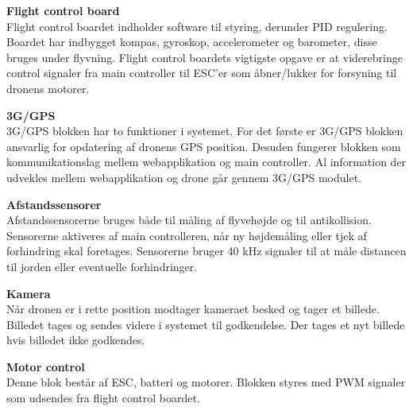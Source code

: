 \textbf{Flight control board}\\
Flight control boardet indholder software til styring, derunder PID regulering. Boardet har indbygget kompas, gyroskop, accelerometer og barometer, disse bruges under flyvning. Flight control boardets vigtigste opgave er at viderebringe control signaler fra main controller til ESC'er som åbner/lukker for forsyning til dronens motorer. 

\textbf{3G/GPS}\\
3G/GPS blokken har to funktioner i systemet. For det første er 3G/GPS blokken ansvarlig for opdatering af dronens GPS position. Desuden fungerer blokken som kommunikationslag mellem webapplikation og main controller. Al information der udvekles mellem webapplikation og drone går gennem 3G/GPS modulet.

\textbf{Afstandssensorer}\\
Afstandssensorerne bruges både til måling af flyvehøjde og til antikollision. Sensorerne aktiveres af main controlleren, når ny højdemåling eller tjek af forhindring skal foretages. Sensorerne bruger 40 kHz signaler til at måle distancen til jorden eller eventuelle forhindringer.

\textbf{Kamera}\\
Når dronen er i rette position modtager kameraet besked og tager et billede. Billedet tages og sendes videre i systemet til godkendelse. Der tages et nyt billede hvis billedet ikke godkendes.

\textbf{Motor control}\\
Denne blok består af ESC, batteri og motorer. Blokken styres med PWM signaler som udsendes fra flight control boardet.

